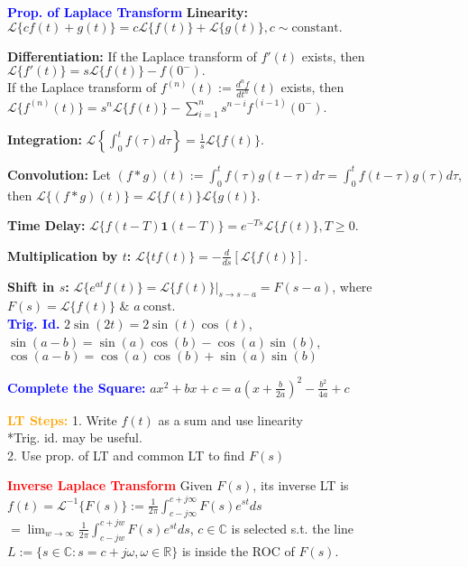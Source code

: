 \documentclass[5pt]{extarticle} %
\begin{document}
\begin{paracol}{3}
{    \textcolor{blue}{\textbf{Prop. of Laplace Transform}} \textbf{Linearity:} \\ 
    $\mathcal{L} \{c f(t) + g(t)\} = c \mathcal{L} \{f(t)\} + \mathcal{L} \{g(t)\}, c \sim \text{constant}.$  
    
    \textbf{Differentiation:} If the Laplace transform of $f'(t)$ exists, then $\mathcal{L} \{f'(t)\} = s \mathcal{L} \{f(t)\} - f(0^-).$  \\
    If the Laplace transform of $f^{(n)}(t) := \frac{d^n f}{dt^n}(t)$ exists, then \\ 
    $\mathcal{L} \{f^{(n)}(t)\} = s^n \mathcal{L} \{f(t)\} - \sum_{i=1}^n s^{n-i} f^{(i-1)}(0^-).$  
    
    \textbf{Integration:}  
    $\mathcal{L} \left\{\int_0^t f(\tau) d\tau \right\} = \frac{1}{s} \mathcal{L} \{f(t)\}.$  
    
    \textbf{Convolution:} Let $(f * g)(t) := \int_0^t f(\tau) g(t-\tau) d\tau = \int_0^t f(t-\tau) g(\tau) d\tau$, then
    $\mathcal{L} \{(f * g)(t)\} = \mathcal{L} \{f(t)\} \mathcal{L} \{g(t)\}.$  
    
    \textbf{Time Delay:} $\mathcal{L} \{f(t-T) \mathbf{1}(t-T)\} = e^{-Ts} \mathcal{L} \{f(t)\}, T \geq 0.$  
    
    \textbf{Multiplication by $t$:} $\mathcal{L} \{t f(t)\} = -\frac{d}{ds} [\mathcal{L} \{f(t)\}].$  
    
    \textbf{Shift in $s$:} $\mathcal{L} \{e^{at} f(t)\} = \mathcal{L} \{f(t)\}\big|_{s \to s-a} = F(s-a)$, where $F(s) = \mathcal{L} \{f(t)\}$ \& $a ~ \text{const}$. \\   

    \textcolor{blue}{\textbf{Trig. Id.}} $2 \sin(2t) = 2 \sin(t) \cos(t)$, $\sin(a-b) = \sin(a) \cos(b) - \cos(a) \sin(b)$, $\cos(a-b) = \cos(a) \cos(b) + \sin(a) \sin(b)$

    \textcolor{blue}{\textbf{Complete the Square:}} $a x^2 + b x + c = a (x + \frac{b}{2a})^2 - \frac{b^2}{4a} + c$
    
    \textcolor{orange}{\textbf{LT Steps:}} 1. Write $f(t)$ as a sum and use linearity \\
    *Trig. id. may be useful. \\
    2. Use prop. of LT and common LT to find $F(s)$  

    \textcolor{red}{\textbf{Inverse Laplace Transform}} Given $F(s)$, its inverse LT is  
    $f(t) = \mathcal{L}^{-1} \{ F(s) \} := \frac{1}{2\pi} \int_{c-j\infty}^{c+j\infty} F(s) e^{st} ds$ \\ 
    $= \lim_{w \to \infty} \frac{1}{2\pi} \int_{c-jw}^{c+jw} F(s) e^{st} ds$, $c \in \mathbb{C}$ is selected s.t. the line $L := \{s \in \mathbb{C} : s = c + j\omega, \omega \in \mathbb{R}\}$ is inside the ROC of $F(s)$.  
    
}
\end{paracol}
\end{document}

